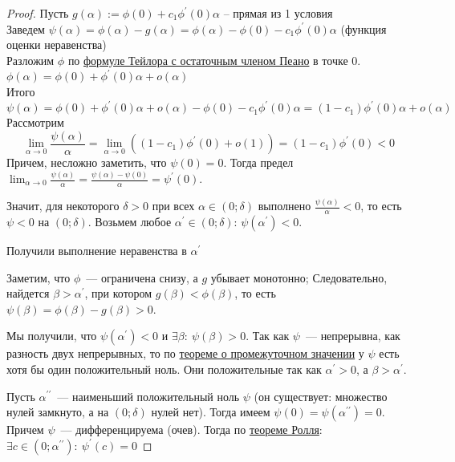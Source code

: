 \begin{proof}
  Пусть $g(\alpha):= \phi(0) + c_1 \phi^{\prime}(0)\alpha$  -- прямая из 1 условия \\
  Заведем $\psi(\alpha) = \phi(\alpha) - g(\alpha) = \phi(\alpha) - \phi(0) - c_1 \phi^{\prime}(0)\alpha$ (функция оценки неравенства) \\
  Разложим $\phi$ по \hyperref[note:F7C9E077-9CAB-4149-83B4-67923B49E2F6]{формуле Тейлора с остаточным членом Пеано} в точке 0. $\phi(\alpha) = \phi(0) + \phi^{\prime}(0) \alpha + o(\alpha)$ \\
  Итого
  \[
  \psi(\alpha) = \phi(0) + \phi^{\prime}(0)\alpha + o(\alpha) - \phi(0) - c_1\phi^{\prime}(0)\alpha = (1 - c_1)\phi^{\prime}(0)\alpha + o(\alpha)
  \]
  Рассмотрим
  \[
  \lim_{\alpha \rightarrow 0} \frac{\psi(\alpha)}{\alpha} = \lim_{\alpha\rightarrow0} ((1-c_1)\phi^{\prime}(0) + o(1)) = (1-c_1)\phi^{\prime}(0) < 0
  \]
  Причем, несложно заметить, что $\psi(0) = 0$. Тогда предел $\lim_{\alpha \rightarrow 0} \frac{\psi(\alpha)}{\alpha} = \frac{\psi(\alpha) - \psi(0)}{\alpha} = \psi^{\prime}(0)$.

  Значит, для некоторого $\delta > 0$ при всех $\alpha \in (0;\delta)$ выполнено $\frac{\psi(\alpha)}{\alpha} < 0$, то есть $\psi < 0$ на $(0;\delta)$. Возьмем любое $\alpha^{\prime} \in (0; \delta)$: $\psi(\alpha^{\prime}) < 0$.

  Получили выполнение неравенства в $\alpha^{\prime}$

  Заметим, что $\phi$~--- ограничена снизу, а $g$ убывает монотонно; Следовательно, найдется $\beta > \alpha^{\prime}$, при котором $g(\beta) < \phi(\beta)$, то есть $\psi(\beta) = \phi(\beta) - g(\beta) > 0$.

  Мы получили, что $\psi(\alpha^{\prime}) < 0$ и $\exists \beta:\  \psi(\beta) > 0$. Так как $\psi$~--- непрерывна, как разность двух непрерывных, то по \hyperref[note:6ADBECA2-157A-4C66-B4C4-F5F2AF0899AE]{теореме о промежуточном значении} у $\psi$ есть хотя бы один положительный ноль.
  Они положительные так как $\alpha^{\prime} > 0$, а $\beta > \alpha^{\prime}$.

  Пусть $\alpha^{\prime\prime}$~--- наименьший положительный ноль $\psi$ (он существует: множество нулей замкнуто, а на $(0;\delta)$ нулей нет). Тогда имеем $\psi(0) = \psi(\alpha^{\prime\prime}) = 0$. Причем $\psi$~--- дифференцируема (очев). Тогда по \hyperref[note:85DC4D66-3AE3-4619-BBEC-9A8113EBF85F]{теореме Ролля}: $\exists c \in (0; \alpha^{\prime\prime}):\ \psi^{\prime}(c) = 0$


\end{proof}
